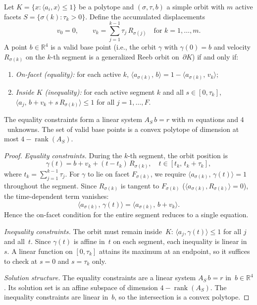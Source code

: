 \begin{lemma}\label{lem:base-point-recovery}
Let $K = \{x : \langle a_i, x \rangle \leq 1\}$ be a polytope
and $(\sigma, \tau, b)$ a simple orbit
with $m$ active facets
$S = \{\sigma(k) : \tau_k > 0\}$.
Define the accumulated displacements
\[
  v_0 = 0, \qquad
  v_k = \sum_{j=1}^{k-1} \tau_j\, R_{\sigma(j)}
  \quad \text{for } k = 1, \ldots, m.
\]
A point $b \in \mathbb{R}^4$ is a valid base point
(i.e., the orbit $\gamma$ with $\gamma(0) = b$ and
velocity $R_{\sigma(k)}$ on the $k$-th segment
is a generalized Reeb orbit on~$\partial K$) if and only if:
\begin{enumerate}
\item \emph{On-facet (equality):}
  for each active $k$,
  $\langle a_{\sigma(k)},\, b \rangle
    = 1 - \langle a_{\sigma(k)},\, v_k \rangle$;
\item \emph{Inside $K$ (inequality):}
  for each active segment $k$ and all $s \in [0, \tau_k]$,
  $\langle a_j,\, b + v_k + s\, R_{\sigma(k)} \rangle
    \leq 1$ for all $j = 1, \ldots, F$.
\end{enumerate}
The equality constraints form
a linear system $A_S\, b = r$ with $m$ equations and $4$~unknowns.
The set of valid base points is a convex polytope of
dimension at most $4 - \operatorname{rank}(A_S)$.
\end{lemma}

\begin{proof}
\emph{Equality constraints.}
During the $k$-th segment, the orbit position is
\[
  \gamma(t) = b + v_k + (t - t_k)\, R_{\sigma(k)},
  \quad t \in [t_k,\, t_k + \tau_k],
\]
where $t_k = \sum_{j=1}^{k-1} \tau_j$.
For $\gamma$ to lie on facet $F_{\sigma(k)}$,
we require $\langle a_{\sigma(k)},\, \gamma(t) \rangle
= 1$ throughout the segment.
Since $R_{\sigma(k)}$ is tangent to $F_{\sigma(k)}$
($\langle a_{\sigma(k)}, R_{\sigma(k)} \rangle = 0$),
the time-dependent term vanishes:
\[
  \langle a_{\sigma(k)},\, \gamma(t) \rangle
  = \langle a_{\sigma(k)},\, b + v_k \rangle.
\]
Hence the on-facet condition for the entire segment
reduces to a single equation.

\emph{Inequality constraints.}
The orbit must remain inside~$K$:
$\langle a_j, \gamma(t) \rangle \leq 1$
for all $j$ and all~$t$.
Since $\gamma(t)$ is affine in~$t$ on each segment,
each inequality is linear in~$s$.
A linear function on $[0, \tau_k]$ attains its
maximum at an endpoint, so it suffices to
check at $s = 0$ and $s = \tau_k$ only.

\emph{Solution structure.}
The equality constraints are a linear system
$A_S\, b = r$ in~$b \in \mathbb{R}^4$.
Its solution set is an affine subspace of
dimension $4 - \operatorname{rank}(A_S)$.
The inequality constraints are linear in~$b$,
so the intersection is a convex polytope.
\end{proof}


